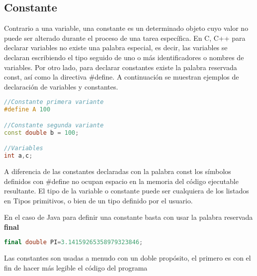 \subsection{Constante}

Contrario a una variable, una constante es un determinado objeto
cuyo valor no puede ser alterado durante el proceso de una tarea específica. En C, C++ para declarar
variables no existe una palabra especial, es decir, las variables se declaran escribiendo el tipo seguido
de uno o más identificadores o nombres de variables. Por otro lado, para declarar constantes existe
la palabra reservada const, así como la directiva #define. A continuación se muestran ejemplos de declaración de variables y constantes.

\begin{lstlisting}[language=C++]
//Constante primera variante
#define A 100

//Constante segunda variante
const double b = 100;

//Variables 
int a,c;
\end{lstlisting}

A diferencia de las constantes declaradas con la palabra const los símbolos definidos con #define no
ocupan espacio en la memoria del código ejecutable resultante.
El tipo de la variable o constante puede ser cualquiera de los listados en Tipos primitivos, o bien de
 un tipo definido por el usuario.

En el caso de Java para definir una constante basta con usar la palabra reservada \textbf{final}

\begin{lstlisting}[language=C++]
final double PI=3.14159265358979323846;
\end{lstlisting}

Las constantes son usadas a menudo con un doble propósito, el primero es con el fin de hacer más
 legible el código del programa

